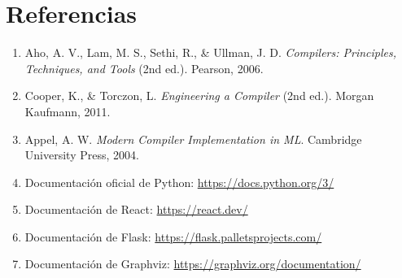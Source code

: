 \documentclass[12pt,a4paper]{article}
\begin{document}
\section{Referencias}

\begin{enumerate}
  \item Aho, A. V., Lam, M. S., Sethi, R., \& Ullman, J. D. \textit{Compilers: Principles, Techniques, and Tools} (2nd ed.). Pearson, 2006.
  \item Cooper, K., \& Torczon, L. \textit{Engineering a Compiler} (2nd ed.). Morgan Kaufmann, 2011.
  \item Appel, A. W. \textit{Modern Compiler Implementation in ML}. Cambridge University Press, 2004.
  \item Documentación oficial de Python: \url{https://docs.python.org/3/}
  \item Documentación de React: \url{https://react.dev/}
  \item Documentación de Flask: \url{https://flask.palletsprojects.com/}
  \item Documentación de Graphviz: \url{https://graphviz.org/documentation/}
\end{enumerate}
\end{document}
